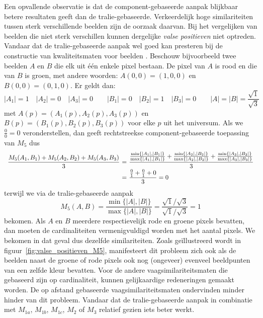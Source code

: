 Een opvallende observatie is dat de component-gebaseerde aanpak blijkbaar betere resultaten 
geeft dan de tralie-gebaseerde. Verkeerdelijk hoge similariteiten tussen sterk verschillende 
beelden zijn de oorzaak daarvan. Bij het vergelijken
van beelden die niet sterk verschillen kunnen dergelijke \emph{valse positieven} niet optreden.
Vandaar dat de tralie-gebaseerde aanpak wel goed kan presteren bij de constructie van
kwaliteitsmaten voor beelden \cite{debaets:similariteitsmaten_voor_kleurbeelden}.
Beschouw bijvoorbeeld twee beelden $A$ en $B$ die elk uit \'e\'en enkele pixel bestaan. De pixel 
van $A$ is rood en die van $B$ is groen, met andere woorden: $A(0,0)=(1,0,0)$ en 
$B(0,0)=(0,1,0)$. Er geldt dan: 
$$
|A_1|=1 \quad |A_2|=0 \quad |A_3|=0 \qquad |B_1|=0 \quad |B_2|=1 \quad |B_3|=0 \qquad |A|=|B|=\frac{\sqrt{1}}{\sqrt{3}}
$$
met $A(p)=(A_1(p),A_2(p),A_3(p))$ en $B(p)=(B_1(p),B_2(p),B_3(p))$ voor elke $p$ uit het universum. Als we
$\frac{0}{0} = 0$ veronderstellen, dan geeft rechtstreekse component-gebaseerde toepassing van 
$M_5$ dus
$$
\begin{array}{r@{\ =\ }l}
\displaystyle\frac{M_5(A_1,B_1)+M_5(A_2,B_2)+M_5(A_3,B_3)}{3} &
\displaystyle\frac{\frac{\min\{|A_1|,|B_1|\}}{\max\{|A_1|,|B_1|\}}+\frac{\min\{|A_2|,|B_2|\}}{\max\{|A_2|,|B_2|\}}+\frac{\min\{|A_3|,|B_3|\}}{\max\{|A_3|,|B_3|\}}}{3} \\[5pt]
 & \displaystyle\frac{\frac{0}{1}+\frac{0}{1}+0}{3} = 0
\end{array}
$$
terwijl we via de tralie-gebaseerde aanpak
$$
M_5(A,B) = \frac{\min\{|A|,|B|\}}{\max\{|A|,|B|\}} = \frac{\scriptstyle \sqrt{1} / \sqrt{3}}{\scriptstyle \sqrt{1} / \sqrt{3}} = 1
$$
bekomen. Als $A$ en $B$ meerdere respectievelijk rode en groene pixels bevatten, dan moeten de cardinaliteiten
vermenigvuldigd worden met het aantal pixels. We bekomen in dat geval dus dezelfde similariteiten. Zoals
ge\"illustreerd wordt in figuur~\ref{fig:valse_positieven_M5}, manifesteert dit probleem zich ook als de 
beelden naast de groene of rode pixels ook nog (ongeveer) evenveel beeldpunten van een zelfde kleur bevatten. 
Voor de andere vaagsimilariteitsmaten die gebaseerd zijn op cardinaliteit, kunnen gelijkaardige redeneringen 
gemaakt worden. De op afstand gebaseerde vaagsimilariteitsmaten ondervinden minder hinder van dit probleem. 
Vandaar dat de tralie-gebaseerde aanpak in combinatie met
$M_{1a}$, $M_{1b}$, $M_{1c}$, $M_{2}$ of $M_{3}$ relatief gezien iets beter werkt. 

